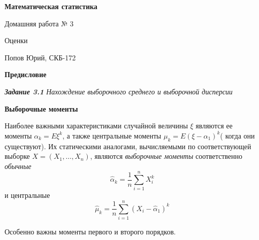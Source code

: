 \documentclass[a4paper,12pt, oneside]{book}
\begin{document}
	\pagestyle{plain}
	
	\begin{titlepage}	
		\begin{center}
			{\Huge \textbf{Математическая статистика}}
			\vspace{30mm}
			
			{\Huge Домашняя работа № 3 \\}
			\vspace{30mm}
			
			{\huge Оценки}
			\vspace{30mm}
			
			{\Large Попов Юрий, СКБ-172}
		\end{center}
	\end{titlepage}
	
	
	
	\begin{spacing}{0.99}          
		\tableofcontents %
	\end{spacing}

\newpage
\begin{center}
	{\Huge{\bf{Предисловие}}}
\end{center}







\newpage
{\large\textit{\textbf{Задание 3.1} Нахождение выборочного среднего и выборочной дисперсии}}

\vspace{5mm}
\large{\textbf{Выборочные моменты}}
\vspace{5mm}

Наиболее важными характеристиками случайной величины $\xi$ являются ее моменты $\alpha_k = E\xi^k$, а также центральные моменты $\mu_k = E(\xi - \alpha_1)^k$( когда они существуют). Их статическими аналогами, вычисляемыми по соответствующей выборке $X = (X_1, \ldots, X_n)$, являются {\it выборочные моменты} соответственно {\it обычные}
$$
\hat{\alpha}_k = \frac{1}{n} \sum\limits_{i = 1}^n X_i^k
$$ 
и центральные 
$$
\hat{\mu}_k = \frac{1}{n} \sum\limits_{i = 1}^n (X_i - \hat{\alpha}_1)^k
$$

Особенно важны моменты первого и второго порядков.
\end{document}
